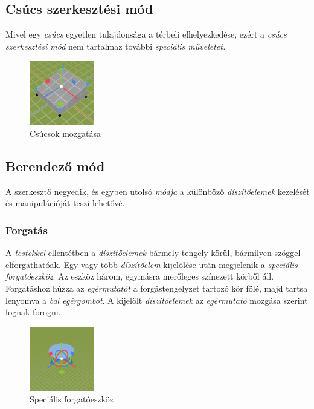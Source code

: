\pagebreak

\subsection{Csúcs szerkesztési mód}

Mivel egy \emph{csúcs} egyetlen tulajdonsága a térbeli elhelyezkedése, ezért a
\emph{csúcs szerkesztési mód} nem tartalmaz további \emph{speciális műveletet.}

\begin{figure}[h]
    \centering
    \includegraphics[width=0.25\textwidth]{parts/user-documentation/editor/images/vertices.png}
    \caption{Csúcsok mozgatása}
\end{figure}

\subsection{Berendező mód}

A szerkesztő negyedik, és egyben utolsó \emph{módja} a különböző \emph{díszítőelemek} kezelését és
manipulációját teszi lehetővé.

\subsubsection{Forgatás}

A \emph{testekkel} ellentétben a \emph{díszítőelemek} bármely tengely körül, bármilyen szöggel
elforgathatóak. Egy vagy több \emph{díszítőelem} kijelölése után megjelenik a
\emph{speciális forgatóeszköz}. Az eszköz három, egymásra merőleges színezett körből áll.
Forgatáshoz húzza az \emph{egérmutatót} a forgástengelyzet tartozó kör fölé, majd tartsa lenyomva
a \emph{bal egérgombot}. A kijelölt \emph{díszítőelemek} az \emph{egérmutató} mozgása szerint
fognak forogni.

\begin{figure}[h]
    \centering
    \includegraphics[width=0.25\textwidth]{parts/user-documentation/editor/images/rotate_gizmo.png}
    \caption{Speciális forgatóeszköz}
\end{figure}

